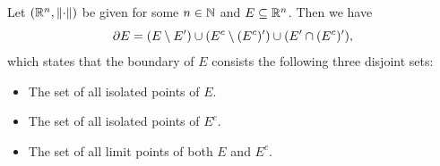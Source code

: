 \bigskip

\begin{theorem} \label{thm:PropertiesOfBoundaryInRn}
    Let $(\R^{n}, \norm*{\cdot})$ be given for some $n \in \N$ and $E \subseteq \R^{n}$. Then we have
    \[
    \partial E = \paren*{E \setminus E'} \cup \paren*{E^{c} \setminus (E^{c})'} \cup \paren*{E' \cap (E^{c})'},
    \]
    which states that the boundary of $E$ consists the following three disjoint sets:
    \begin{itemize}
        \item The set of all isolated points of $E$.
        \item The set of all isolated points of $E^{c}$.
        \item The set of all limit points of both $E$ and $E^{c}$.
    \end{itemize}
\end{theorem}

